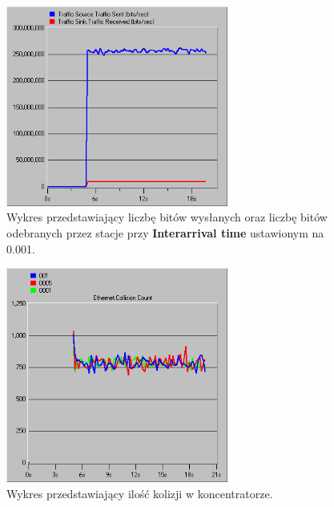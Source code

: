 \documentclass{article}
\begin{document}
\begin{figure}[H]
  \centering
  \includegraphics[width=0.65\textwidth]{screens/samo/0001_sentrec.png}
 \caption{Wykres przedstawiający liczbę bitów wysłanych oraz liczbę bitów odebranych przez stacje przy \textbf{Interarrival time} ustawionym na 0.001. }
 \label{fig:sentrec0001}
\end{figure}



\begin{figure}[H]
  \centering
  \includegraphics[width=0.65\textwidth]{screens/samo/koncentrator_collisioncount.png}
  \caption{Wykres przedstawiający ilość kolizji w koncentratorze.}
  \label{fig:collisioncount}
\end{figure}
\end{document}
